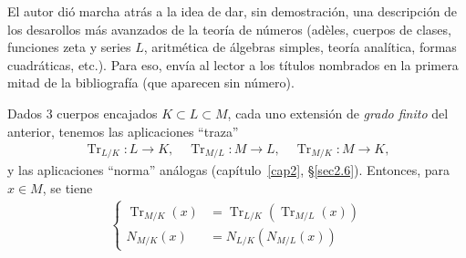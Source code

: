 \documentclass[oneside,bibtotoc,leqno,spanish]{amsbook}
\renewcommand{\to}[1][]{\xrightarrow{#1}}
\DeclareMathOperator{\Tr}{Tr}
\numberwithin{equation}{section}
\theoremstyle{defi}
\theoremstyle{note}
\theoremstyle{rem}
\numberwithin{theorem}{section}
\numberwithin{proposition}{section}
\numberwithin{definition}{section}
\numberwithin{lemma}{section}
\numberwithin{corollary}{section}
\numberwithin{example}{section}
\numberwithin{footnote}{section}%
\begin{document}
El autor di\'o marcha atr\'as a la idea de dar, sin demostraci\'on, una descripci\'on de los desarollos m\'as avanzados
de la teor\'ia de n\'umeros (ad\`eles, cuerpos de clases, funciones zeta y series $L$, aritm\'etica de \'algebras
simples, teor\'ia anal\'itica, formas cuadr\'aticas, etc.). Para eso, env\'ia al lector a los t\'itulos nombrados
en la primera mitad de la bibliograf\'ia (que aparecen sin n\'umero).


Dados $3$ cuerpos encajados $K\subset L\subset M$, cada uno extensi\'on de {\em grado finito} del anterior, tenemos las
aplicaciones ``traza''
\begin{gather*}
\Tr_{L/K}:L\to K,\quad\Tr_{M/L}:M\to L,\quad\Tr_{M/K}:M\to K,
\end{gather*}
y las aplicaciones ``norma'' an\'alogas (cap\'itulo~\ref{cap2}, \S\ref{sec2.6}). Entonces, para $x\in M$, se tiene
\begin{gather}
\left\{\begin{aligned}
\Tr_{M/K}(x) &= \Tr_{L/K}(\Tr_{M/L}(x))\\
N_{M/K}(x) &= N_{L/K}(N_{M/L}(x))
\end{aligned}
\right.
\end{gather}

\end{document}
